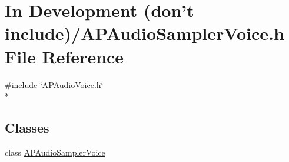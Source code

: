 \hypertarget{_in_01_development_01_07don't_01include_08_2_a_p_audio_sampler_voice_8h}{\section{In Development (don't include)/\+A\+P\+Audio\+Sampler\+Voice.h File Reference}
\label{_in_01_development_01_07don't_01include_08_2_a_p_audio_sampler_voice_8h}
}
{\ttfamily \#include \char`\"{}A\+P\+Audio\+Voice.\+h\char`\"{}}\\*
\subsection*{Classes}
\begin{DoxyCompactItemize}
\item 
class \hyperlink{class_a_p_audio_sampler_voice}{A\+P\+Audio\+Sampler\+Voice}
\end{DoxyCompactItemize}
